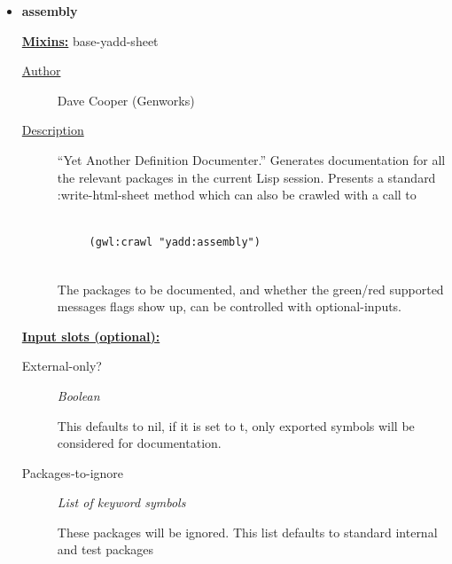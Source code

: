 \documentclass [11pt]{book}
\begin{document}
\begin{itemize}

\item {}
\label{prim:assembly}
\textbf{assembly}


\textbf{
\underline{Mixins:}} base-yadd-sheet





\begin{description}

\item [
\underline{Author}]


Dave Cooper (Genworks)



\item [
\underline{Description}]


``Yet Another Definition Documenter.'' Generates 
documentation for all the relevant packages in the current Lisp session. Presents a 
standard :write-html-sheet method which can also be crawled with a call to 


\begin{verbatim}

     (gwl:crawl "yadd:assembly")


\end{verbatim}

The packages to be documented, and whether the green/red supported 
messages flags show up, can be controlled with optional-inputs.



\end{description}








\textbf{
\underline{Input slots (optional):}}

\begin{description}

\item [External-only?]
\emph{Boolean}

 This defaults to nil, if it is set to t, only exported symbols will be
considered for documentation.




\item [Packages-to-ignore]
\emph{List of keyword symbols}

 These packages will be ignored.
This list defaults to standard internal and test packages





\end{description}
\end{itemize}
\end{document}
